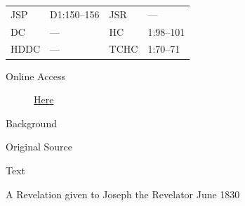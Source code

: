 				\begin{tabular}{p{0.5in}p{1in}p{0.5in}p{1in}}
				JSP	 	& D1:150--156	& JSR 		& --- 		\\
				DC	 	& ---			& HC 		& 1:98--101 \\
				HDDC 	& ---			& TCHC 		& 1:70--71 \\
				\end{tabular}
			
			\begin{description}
				\item[Online Access] \href{https://www.josephsmithpapers.org/paper-summary/visions-of-moses-june-1830-moses-1/1}{Here}
			\end{description}
			
			\begin{description}
				\item[Background]
			\end{description}
			
			
			\begin{description}
				\item[Original Source]
			\end{description}
			
			
			\begin{description}
				\item[Text]
			\end{description}
			
				\begin{tightcenter}
				A Revelation given to Joseph the Revelator June 1830
				\end{tightcenter}
				
